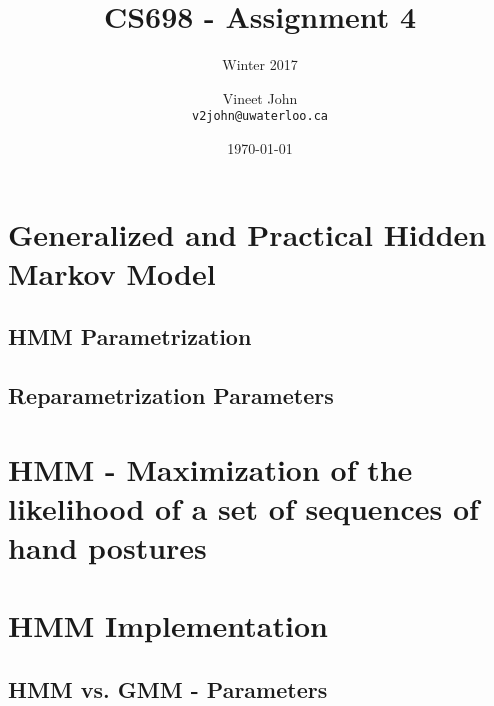 \documentclass[parskip=half]{scrartcl}
\begin{document}
\title{CS698 - Assignment 4}
\subtitle{Winter 2017}
\author{
    Vineet John\\
    \texttt{v2john@uwaterloo.ca}
}
\date{\today}
\maketitle


\section{Generalized and Practical Hidden Markov Model} %
\label{sec:generalized_and_practical_hidden_markov_model}


    \subsection{HMM Parametrization} %
    \label{sub:hmm_parametrization}
    


    \subsection{Reparametrization Parameters} %
    \label{sub:reparametrization_parameters}
    




\section{HMM - Maximization of the likelihood of a set of sequences of hand postures} %
\label{sec:hmm_maximization_of_the_likelihood_of_a_set_of_sequences_of_hand_postures}



\section{HMM Implementation} %
\label{sec:hmm_implementation}


    \subsection{HMM vs. GMM - Parameters} %
    \label{sub:hmm_vs_gmm_parameters}
    
\end{document}
